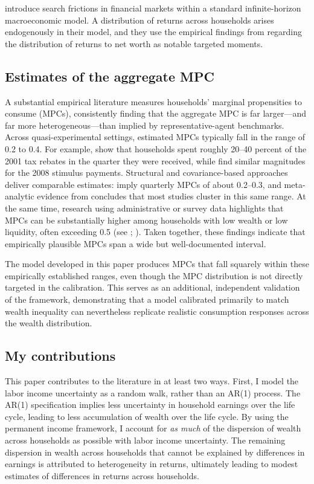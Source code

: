 \par \cite{Menzio2025} introduce search frictions in financial markets within a standard infinite-horizon macroeconomic model. A distribution of returns across households arises endogenously in their model, and they use the empirical findings from \cite{aflgdmlp20} regarding the distribution of returns to net worth as notable targeted moments.

\subsection{Estimates of the aggregate MPC}


A substantial empirical literature measures households' marginal propensities to consume (MPCs), consistently finding that the aggregate MPC is far larger---and far more heterogeneous---than implied by representative-agent benchmarks. Across quasi-experimental settings, estimated MPCs typically fall in the range of 0.2 to 0.4. For example, \cite{Johnson2006} show that households spent roughly 20--40 percent of the 2001 tax rebates in the quarter they were received, while \cite{Parker2013} find similar magnitudes for the 2008 stimulus payments. Structural and covariance-based approaches deliver comparable estimates: \cite{Blundell2008} imply quarterly MPCs of about 0.2--0.3, and meta-analytic evidence from \cite{Havranek2020} concludes that most studies cluster in this same range. At the same time, research using administrative or survey data highlights that MPCs can be substantially higher among households with low wealth or low liquidity, often exceeding 0.5 (see \cite{Jappelli2014}; \cite{Fagereng2021}). Taken together, these findings indicate that empirically plausible MPCs span a wide but well-documented interval.

\par The model developed in this paper produces MPCs that fall squarely within these empirically established ranges, even though the MPC distribution is not directly targeted in the calibration. This serves as an additional, independent validation of the framework, demonstrating that a model calibrated primarily to match wealth inequality can nevertheless replicate realistic consumption responses across the wealth distribution. 

\subsection{My contributions}

\par This paper contributes to the literature in at least two ways. First, I  model the labor income uncertainty as a random walk, rather than an AR(1) process. The AR(1) specification implies less uncertainty in household earnings over the life cycle, leading to less accumulation of wealth over the life cycle. By using the permanent income framework, I account for \textit{as much} of the dispersion of wealth across households as possible with labor income uncertainty. The remaining dispersion in wealth across households that cannot be explained by differences in earnings is attributed to heterogeneity in returns, ultimately leading to modest estimates of differences in returns across households.

